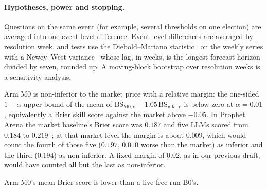 \documentclass[10pt]{article}
\theoremstyle{remark}
\begin{document}
\paragraph{Hypotheses, power and stopping.} Questions on the same event (for example, several thresholds on one election) are averaged into one event-level difference. Event-level differences are averaged by resolution week, and tests use the Diebold--Mariano statistic~\cite{dieboldmariano1995} on the weekly series with a Newey--West variance~\cite{neweywest1987} whose lag, in weeks, is the longest forecast horizon divided by seven, rounded up. A moving-block bootstrap over resolution weeks is a sensitivity analysis.
\begin{description}
\setlength\itemsep{1pt}
\item[H12 (primary).] Arm M0 is non-inferior to the market price with a relative margin: the one-sided $1-\alpha$ upper bound of the mean of $\mathrm{BS}_{\mathrm{M0},e}-1.05\,\mathrm{BS}_{\mathrm{mkt},e}$ is below zero at $\alpha=0.01$, equivalently a Brier skill score against the market above $-0.05$. In Prophet Arena the market baseline's Brier score was $0.187$ and five LLMs scored from $0.184$ to $0.219$~\cite{yang2025prophet}; at that market level the margin is about $0.009$, which would count the fourth of those five ($0.197$, $0.010$ worse than the market) as inferior and the third ($0.194$) as non-inferior. A fixed margin of $0.02$, as in our previous draft, would have counted all but the last as non-inferior.
\item[H13 (secondary).] Arm M0's mean Brier score is lower than a live free run B0's.
\end{description}
\end{document}
